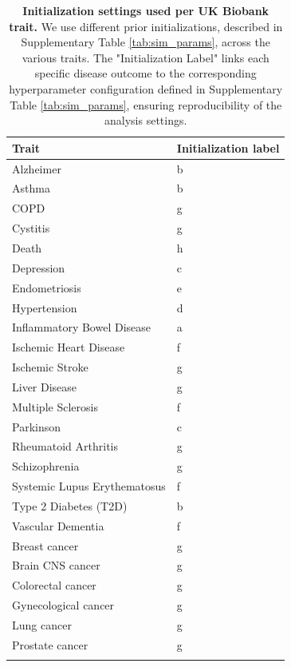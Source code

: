 \begin{table}[H]
    \caption[Initialization settings used per UK Biobank trait]{\textbf{Initialization settings used per UK Biobank trait.} We use different prior initializations, described in Supplementary Table \ref{tab:sim_params}, across the various traits. The "Initialization Label" links each specific disease outcome to the corresponding hyperparameter configuration defined in Supplementary Table \ref{tab:sim_params}, ensuring reproducibility of the analysis settings.\label{tab:trait_init}}
    \begin{center}
    \begin{tabular}{ll}
    \toprule
    \bf{Trait} & \bf{Initialization label} \\
    \midrule
    Alzheimer & b \\
    Asthma & b \\
    COPD & g \\
    Cystitis & g \\
    Death & h \\
    Depression & c \\
    Endometriosis & e \\
    Hypertension & d \\
    Inflammatory Bowel Disease & a \\
    Ischemic Heart Disease & f \\
    Ischemic Stroke & g \\
    Liver Disease & g \\
    Multiple Sclerosis & f \\
    Parkinson & c \\
    Rheumatoid Arthritis & g \\
    Schizophrenia & g \\
    Systemic Lupus Erythematosus & f \\
    Type 2 Diabetes (T2D) & b \\
    Vascular Dementia & f \\
    Breast cancer & g \\
    Brain CNS cancer & g \\
    Colorectal cancer & g \\
    Gynecological cancer & g \\
    Lung cancer & g \\
    Prostate cancer & g \\
    \botrule
    \end{tabular}
    \end{center}
\end{table}

